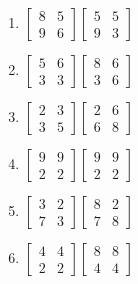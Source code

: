 \documentclass[20pt]{extarticle}
\begin{document}
\begin{minipage}{0.7\linewidth}
\begin{multicols}{3}
\begin{enumerate}
                \item \(\begin{bmatrix}
                        8 & 5\\
                        9 & 6
                    \end{bmatrix}\begin{bmatrix}
                        5 & 5\\
                        9 & 3
                    \end{bmatrix}\)
                \item \(\begin{bmatrix}
                        5 & 6\\
                        3 & 3
                    \end{bmatrix}\begin{bmatrix}
                        8 & 6\\
                        3 & 6
                    \end{bmatrix}\)
                \item \(\begin{bmatrix}
                        2 & 3\\
                        3 & 5
                    \end{bmatrix}\begin{bmatrix}
                        2 & 6\\
                        6 & 8
                    \end{bmatrix}\)
                \item \(\begin{bmatrix}
                        9 & 9\\
                        2 & 2
                    \end{bmatrix}\begin{bmatrix}
                        9 & 9\\
                        2 & 2
                    \end{bmatrix}\)
                \item \(\begin{bmatrix}
                        3 & 2\\
                        7 & 3
                    \end{bmatrix}\begin{bmatrix}
                        8 & 2\\
                        7 & 8
                    \end{bmatrix}\)
                \item \(\begin{bmatrix}
                        4 & 4\\
                        2 & 2
                    \end{bmatrix}\begin{bmatrix}
                        8 & 8\\
                        4 & 4
                    \end{bmatrix}\)
    

\end{enumerate}
\end{multicols}
\end{minipage}
\end{document}
